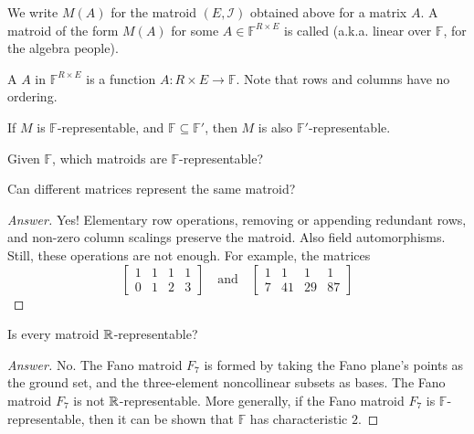 We write \(M(A)\) for the matroid \((E, \mathcal{I})\) obtained above for a matrix \(A\).
A matroid of the form \(M(A)\) for some \(A \in \mathbb{F}^{R \times E}\) is called  (a.k.a. linear over \(\mathbb{F}\), for the algebra people).

A  \(A\) in \(\mathbb{F}^{R \times E}\) is a function \(A \colon R \times E \to \mathbb{F}\).
Note that rows and columns have no ordering.

\begin{note}
    If \(M\) is \(\mathbb{F}\)-representable, and \(\mathbb{F} \subseteq \mathbb{F}'\), then \(M\) is also \(\mathbb{F}'\)-representable.
\end{note}

\begin{question}
    Given \(\mathbb{F}\), which matroids are \(\mathbb{F}\)-representable?
\end{question}

\begin{question}
    Can different matrices represent the same matroid?
\end{question}

\begin{proof}[Answer]
    Yes! Elementary row operations, removing or appending redundant rows, and non-zero column scalings preserve the matroid. Also field automorphisms.
    Still, these operations are not enough. For example, the matrices
    \begin{equation}
        \begin{bmatrix}
            1 & 1 & 1 & 1 \\
            0 & 1 & 2 & 3
        \end{bmatrix}
        \quad \text{and} \quad
        \begin{bmatrix}
            1 & 1 & 1 & 1 \\
            7 & 41 & 29 & 87
        \end{bmatrix}
    \end{equation}
\end{proof}

\begin{question}
    Is every matroid \(\mathbb{R}\)-representable?
\end{question}

\begin{proof}[Answer]
    No.
    The Fano matroid \(F_7\) is formed by taking the Fano plane's points as the ground set,
    and the three-element noncollinear subsets as bases.
    The Fano matroid \(F_7\) is not \(\mathbb{R}\)-representable.
    More generally, if the Fano matroid \(F_7\) is \(\mathbb{F}\)-representable,
    then it can be shown that \(\mathbb{F}\) has characteristic \(2\).
\end{proof}

